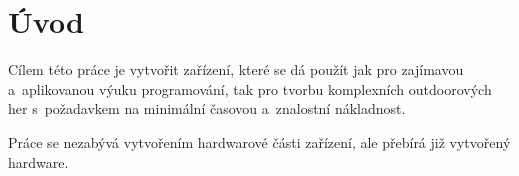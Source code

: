 \chapter*{Úvod}

Cílem této práce je vytvořit zařízení, které se dá použít jak pro zajímavou a~aplikovanou výuku programování, tak pro tvorbu komplexních outdoorových her s~požadavkem na minimální časovou a~znalostní nákladnost.

Práce se nezabývá vytvořením hardwarové části zařízení, ale přebírá již vytvořený hardware\cite{BlackBox_hardware}.


